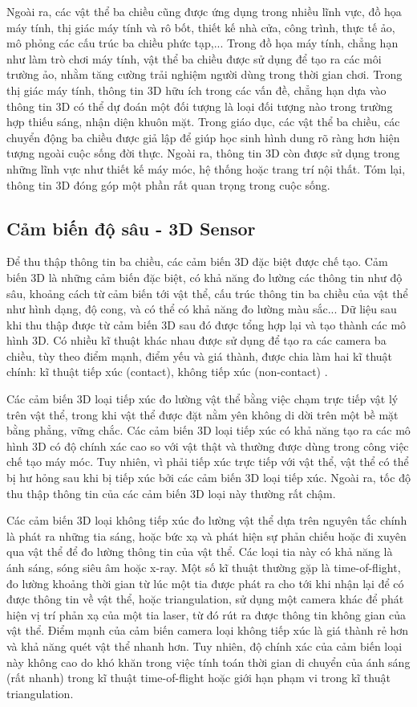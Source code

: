 Ngoài ra, các vật thể ba chiều cũng được ứng dụng trong nhiều lĩnh vực, đồ họa máy tính, thị giác máy tính và rô bốt, thiết kế nhà cửa, công trình, thực tế ảo, mô phỏng các cấu trúc ba chiều phức tạp,... Trong đồ họa máy tính, chẳng hạn như làm trò chơi máy tính, vật thể ba chiều được sử dụng để tạo ra các môi trường ảo, nhằm tăng cường trải nghiệm người dùng trong thời gian chơi. Trong thị giác máy tính, thông tin 3D hữu ích trong các vấn đề, chẳng hạn dựa vào thông tin 3D có thể dự đoán một đối tượng là loại đối tượng nào trong trường hợp thiếu sáng, nhận diện khuôn mặt. Trong giáo dục, các vật thể ba chiều, các chuyển động ba chiều được giả lập để giúp học sinh hình dung rõ ràng hơn hiện tượng ngoài cuộc sống đời thực. Ngoài ra, thông tin 3D còn được sử dụng trong những lĩnh vực như thiết kế máy móc, hệ thống hoặc trang trí nội thất. Tóm lại, thông tin 3D đóng góp một phần rất quan trọng trong cuộc sống.

\subsection{Cảm biến độ sâu - 3D Sensor}
Để thu thập thông tin ba chiều, các cảm biến 3D đặc biệt được chế tạo. Cảm biến 3D là những cảm biến đặc biệt, có khả năng đo lường các thông tin như độ sâu, khoảng cách từ cảm biến tới vật thể, cấu trúc thông tin ba chiều của vật thể như hình dạng, độ cong, và có thể có khả năng  đo lường màu sắc... Dữ liệu sau khi thu thập được từ cảm biến 3D sau đó được tổng hợp lại và tạo thành các mô hình 3D. Có nhiều kĩ thuật khác nhau được sử dụng để tạo ra các camera ba chiều, tùy theo điểm mạnh, điểm yếu và giá thành, được chia làm hai kĩ thuật chính: kĩ thuật tiếp xúc (contact), không tiếp xúc (non-contact) \cite{3DSensorTypes}.

Các cảm biến 3D loại tiếp xúc đo lường vật thể bằng việc chạm trực tiếp vật lý trên vật thể, trong khi vật thể được đặt nằm yên không di dời trên một bề mặt bằng phẳng, vững chắc. Các cảm biến 3D loại tiếp xúc có khả năng tạo ra các mô hình 3D có độ chính xác cao so với vật thật và thường được dùng trong công việc chế tạo máy móc. Tuy nhiên, vì phải tiếp xúc trực tiếp với vật thể,  vật thể có thể bị hư hỏng sau khi bị tiếp xúc bởi các cảm biến 3D loại tiếp xúc. Ngoài ra, tốc độ thu thập thông tin của các cảm biến 3D loại này thường rất chậm.

Các cảm biến 3D loại không tiếp xúc đo lường vật thể dựa trên nguyên tắc chính là phát ra những tia sáng, hoặc bức xạ và phát hiện sự phản chiếu hoặc đi xuyên qua vật thể để đo lường thông tin của vật thể. Các loại tia này có khả năng là ánh sáng, sóng siêu âm hoặc x-ray. Một số kĩ thuật thường gặp là time-of-flight, đo lường khoảng thời gian từ lúc một tia được phát ra cho tới khi nhận lại để có được thông tin về vật thể, hoặc triangulation, sử dụng một camera khác để phát hiện vị trí phản xạ của một tia laser, từ đó rút ra được thông tin không gian của vật thể. Điểm mạnh của cảm biến camera loại không tiếp xúc là giá thành rẻ hơn và khả năng quét vật thể nhanh hơn. Tuy nhiên, độ chính xác của cảm biến loại này không cao do khó khăn trong việc tính toán thời gian di chuyển của ánh sáng (rất nhanh) trong kĩ thuật time-of-flight hoặc giới hạn phạm vi trong kĩ thuật triangulation.

